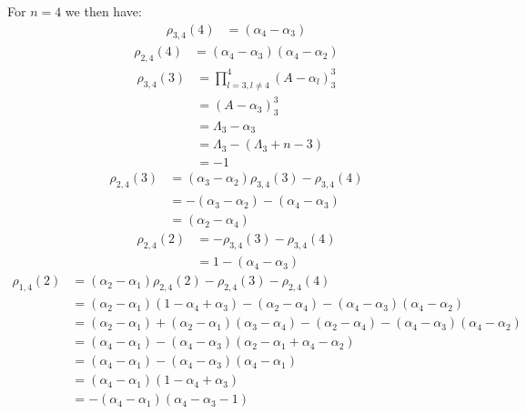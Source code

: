 \documentclass[12pt]{article}
\begin{document}
For $n=4$ we then have:
\begin{align*}
\rho_{3,4}(4) &= (\alpha_4 - \alpha_3)
\end{align*}
\begin{align*}
\rho_{2,4}(4) &= (\alpha_4 - \alpha_3)(\alpha_4 - \alpha_2)
\end{align*}
\begin{align*}
\rho_{3,4}(3) &=  \prod_{l=3,l \neq 4}^4(A - \alpha_l)^3_3\\
&=  (A - \alpha_3)^3_3 \\
&= \Lambda_3 - \alpha_3 \\
&= \Lambda_3 - (\Lambda_3 + n - 3) \\
&= -1
\end{align*}
\begin{align*}
\rho_{2,4}(3) &= (\alpha_3 - \alpha_2) \rho_{3,4}(3) - \rho_{3,4}(4) \\
&= -(\alpha_3 - \alpha_2) - (\alpha_4 - \alpha_3) \\
&= (\alpha_2 - \alpha_4)
\end{align*}
\begin{align*}
\rho_{2,4}(2) &= - \rho_{3,4}(3) - \rho_{3,4}(4)\\
&= 1 - (\alpha_4 - \alpha_3)
\end{align*}
\begin{align*}
\rho_{1,4}(2) &= (\alpha_2 - \alpha_1) \rho_{2,4}(2) - \rho_{2,4}(3) - \rho_{2,4}(4) \\
&= (\alpha_2 - \alpha_1) (1 - \alpha_4 + \alpha_3) - (\alpha_2 - \alpha_4) - (\alpha_4 - \alpha_3)(\alpha_4 - \alpha_2) \\
&= (\alpha_2 - \alpha_1)  + (\alpha_2 - \alpha_1) (\alpha_3 - \alpha_4)  - (\alpha_2 - \alpha_4) - (\alpha_4 - \alpha_3)(\alpha_4 - \alpha_2) \\
&= (\alpha_4 - \alpha_1)  - (\alpha_4 - \alpha_3)( \alpha_2 - \alpha_1 + \alpha_4 - \alpha_2 ) \\
&= (\alpha_4 - \alpha_1)  - (\alpha_4 - \alpha_3)(\alpha_4 - \alpha_1  ) \\
&= (\alpha_4 - \alpha_1) ( 1 -\alpha_4 + \alpha_3) \\
&= -(\alpha_4 - \alpha_1) ( \alpha_4 - \alpha_3 - 1)
\end{align*}

\end{document}
